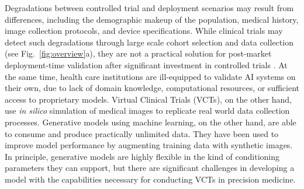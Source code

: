 Degradations between controlled trial and deployment scenarios may result from differences, including the demographic makeup of the population, medical history, image collection protocols, and device specifications.
While clinical trials may detect such degradations through large scale cohort selection and data collection (see Fig.~\ref{fig:overview}a), they are not a practical solution for post-market deployment-time validation after significant investment in controlled trials \cite{rajpurkar2022ai, menard2024artificial}.
At the same time, health care institutions are ill-equipped to validate AI systems on their own, due to lack of domain knowledge, computational resources, or sufficient access to proprietary models.
Virtual Clinical Trials (VCTs), on the other hand, use \emph{in silico} simulation of medical images to replicate real world data collection processes.
Generative models using machine learning, on the other hand, are able to consume and produce practically unlimited data.\cite{ibrahim2024generative}
They have been used to improve model performance by augmenting training data with synthetic images.\cite{khader2023denoising}
In principle, generative models are highly flexible in the kind of conditioning parameters they can support, but there are significant challenges in developing a model with the capabilities necessary for conducting VCTs in precision medicine.
